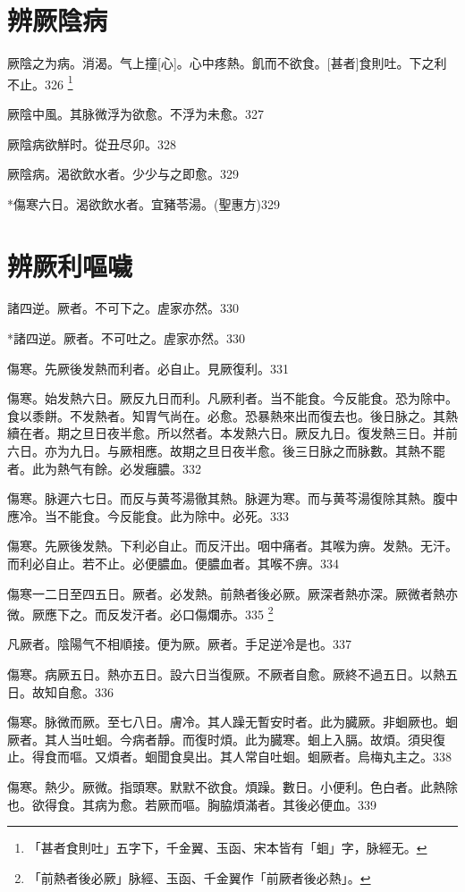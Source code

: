 \documentclass[12pt,twoside,UTF8,b5paper]{ctexbook}
\begin{document}
\chapter{辨厥陰病}

厥陰之为病。消渴。气上撞[心]。心中疼熱。飢而不欲食。[甚者]食則吐。下之利不止。326
	\footnote{「甚者食則吐」五字下，千金翼、玉函、宋本皆有「蛔」字，脉經无。}

厥陰中風。其脉微浮为欲愈。不浮为未愈。327

厥陰病欲觧时。從丑尽卯。328

厥陰病。渴欲飲水者。少少与之即愈。329

*傷寒六日。渴欲飲水者。宜豬苓湯。(聖惠方)329

\chapter{辨厥利嘔噦}

諸四逆。厥者。不可下之。虗家亦然。330

*諸四逆。厥者。不可吐之。虗家亦然。330

傷寒。先厥後发熱而利者。必自止。見厥復利。331

傷寒。始发熱六日。厥反九日而利。凡厥利者。当不能食。今反能食。恐为除中。食以黍餅。不发熱者。知胃气尚在。必愈。恐暴熱來出而復去也。後日脉之。其熱續在者。期之旦日夜半愈。所以然者。本发熱六日。厥反九日。復发熱三日。并前六日。亦为九日。与厥相應。故期之旦日夜半愈。後三日脉之而脉數。其熱不罷者。此为熱气有餘。必发癰膿。332

傷寒。脉遲六七日。而反与黄芩湯徹其熱。脉遲为寒。而与黄芩湯復除其熱。腹中應冷。当不能食。今反能食。此为除中。必死。333

傷寒。先厥後发熱。下利必自止。而反汗出。咽中痛者。其喉为痹。发熱。无汗。而利必自止。若不止。必便膿血。便膿血者。其喉不痹。334

傷寒一二日至四五日。厥者。必发熱。前熱者後必厥。厥深者熱亦深。厥微者熱亦微。厥應下之。而反发汗者。必口傷爛赤。335
	\footnote{「前熱者後必厥」脉經、玉函、千金翼作「前厥者後必熱」。}

凡厥者。陰陽气不相順接。便为厥。厥者。手足逆冷是也。337

傷寒。病厥五日。熱亦五日。設六日当復厥。不厥者自愈。厥終不過五日。以熱五日。故知自愈。336

傷寒。脉微而厥。至七八日。膚冷。其人躁无暫安时者。此为臓厥。非蛔厥也。蛔厥者。其人当吐蛔。今病者靜。而復时煩。此为臓寒。蛔上入膈。故煩。須臾復止。得食而嘔。又煩者。蛔聞食臭出。其人常自吐蛔。蛔厥者。烏梅丸主之。338

傷寒。熱少。厥微。指頭寒。默默不欲食。煩躁。數日。小便利。色白者。此熱除也。欲得食。其病为愈。若厥而嘔。胸脇煩滿者。其後必便血。339
\end{document}
